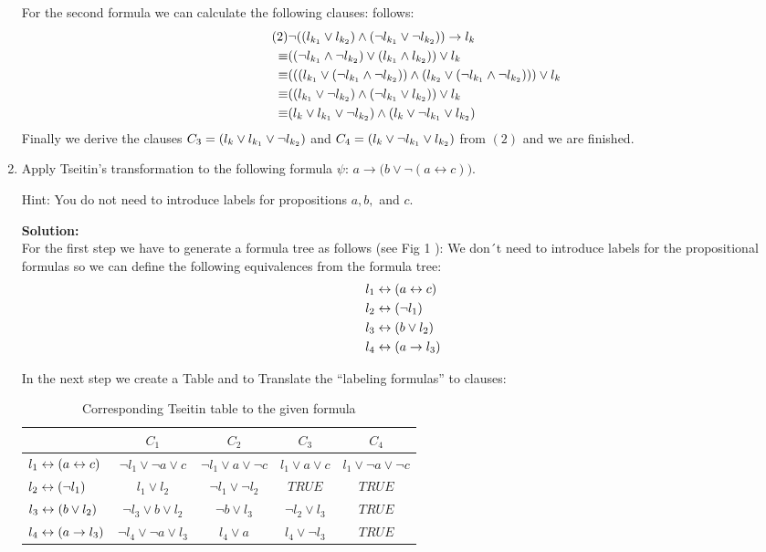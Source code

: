 \documentclass[11pt,a4paper]{uebung}
\newcommand{\solution}[1]{\par {\bf Solution:}\\#1}
\begin{document}
\begin{enumerate}
{\begin{itemize}
     For the second formula we can calculate the following clauses:
      follows:
      \begin{align*}
        \tag{2}& \neg((l_{k_1} \lor l_{k_2}) \land (\neg l_{k_1} \lor
        \neg l_{k_2})) \rightarrow l_{k}\\
        \equiv & ((\neg l_{k_1} \land \neg l_{k_2}) \lor (l_{k_1} \land
        l_{k_2}))\lor l_{k}\\
        \equiv & (((l_{k_1} \lor (\neg l_{k_1}\land\neg l_{k_2})) \land (l_{k_2}
        \lor (\neg l_{k_1}\land\neg l_{k_2})))\lor l_{k}\\
        \equiv & ((l_{k_1} \lor\neg l_{k_2}) \land (\neg l_{k_1}\lor l_{k_2})) \lor
        l_{k}\\
        \equiv & (l_{k} \lor l_{k_1} \lor\neg l_{k_2}) \land (l_{k} \lor \neg l_{k_1}\lor l_{k_2})
      \end{align*}
      Finally we derive the clauses 
      $C_{3}=(l_{k} \lor l_{k_1} \lor\neg l_{k_2})$
      and $C_{4}=(l_{k} \lor \neg l_{k_1}\lor l_{k_2})$ from $(2)$ and we are finished.
    \end{itemize} 
  }

\item Apply Tseitin's transformation to the following formula $\psi$: $a \rightarrow
  \big( b \lor \neg (a \leftrightarrow c)\big)$.

  
  Hint: You do not need to introduce labels for propositions $a,b,$ and $c$.
  \solution{
For the first step we have to generate a formula tree as follows (see Fig 1 ):
We don´t need to introduce labels for the propositional formulas so we can define the following equivalences from the formula tree:
    \begin{align*}
      l_1 &\leftrightarrow (a \leftrightarrow c)\\
      l_2 &\leftrightarrow (\neg l_{1})\\
      l_3 &\leftrightarrow (b \lor l_{2})\\
      l_4 &\leftrightarrow (a \rightarrow l_{3})\\
    \end{align*}

In the next step we create a Table and to Translate the “labeling formulas” to clauses:

    \begin{table}[ht]
      \centering
      \begin{tabular}{l|cccc}
        & $C_{1}$ & $C_{2}$ & $C_{3}$ & $C_{4}$ \\
        \hline
        $l_1 \leftrightarrow (a \leftrightarrow c)$ & $\neg l_{1}\lor\neg a \lor c$ & $\neg l_{1} \lor  a \lor
        \neg c$ & $l_{1}\lor a\lor c$ & $l_{1}\lor\neg a\lor \neg c$\\
        $l_{2}\leftrightarrow (\neg l_{1})$& $l_{1} \lor l_{2}$ & $\neg l_{1}\lor \neg
        l_{2}$ & $TRUE$ & $TRUE$\\
        $l_3 \leftrightarrow (b \lor l_{2})$ & $\neg l_{3} \lor b \lor l_{2}$ & $\neg b \lor
        l_{3}$ & $\neg l_{2} \lor l_{3}$ &$TRUE$\\
        $l_4 \leftrightarrow (a \rightarrow l_{3})$ & $\neg l_{4} \lor \neg a \lor  l_{3}$ &
        $l_{4} \lor a$ & $l_{4} \lor \neg l_{3}$&$TRUE$
      \end{tabular}
      \caption{Corresponding Tseitin table to the given formula}
      \label{tab:tseitin}
    \end{table}

}
\end{enumerate}
\end{document}
